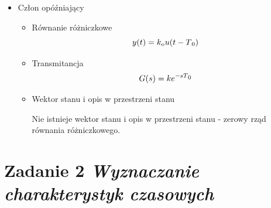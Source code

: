 \documentclass[a4paper,10pt]{article}
\begin{document}
\begin{itemize}
\item Człon opóźniający
\begin{itemize}
	\item Równanie różniczkowe
	\begin{equation}
	y(t) = k\textsubscript o u(t-T\textsubscript 0)
	\end{equation}
	\item Transmitancja
	\begin{equation}
	G(s) = ke^{-sT\textsubscript 0}
	\end{equation}
	\item Wektor stanu i opis w przestrzeni stanu
	
	Nie istnieje wektor stanu i opis w przestrzeni stanu - zerowy rząd równania różniczkowego.
\end{itemize}
\end{itemize}

\section{Zadanie 2 \textit{\small Wyznaczanie charakterystyk czasowych}}\label{sec:zad2}
\end{document}
